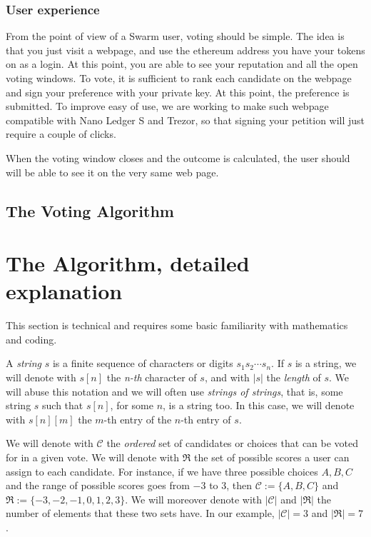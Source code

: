 \documentclass[submission, copyright,creativecommons,sharealike,noncommercial]{eptcs}
\newcommand{\candidates}{\ensuremath{\mathcal{C}} \xspace}
\newcommand{\range}{\ensuremath{\mathfrak{R}}\xspace}
\begin{document}
\subsubsection{User experience}
	From the point of view of a Swarm user, voting should be simple. The idea is that you just visit a webpage, and use the ethereum address you have your tokens on as a login. At this point, you are able to see your reputation and all the open voting windows. To vote, it is sufficient to rank each candidate on the webpage and sign your preference with your private key. At this point, the preference is submitted. To improve easy of use, we are working to make such webpage compatible with Nano Ledger S and Trezor, so that signing your petition will just require a couple of clicks.
	
	When the voting window closes and the outcome is calculated, the user should will be able to see it on the very same web page.
	
\subsection{The Voting Algorithm}	










\section{The Algorithm, detailed explanation}
	This section is technical and requires some basic familiarity with mathematics and coding. 

	\begin{definition}
		A \emph{string} $s$ is a finite sequence of characters or digits $s_1 s_2 \cdots s_n$. If $s$ is a string, we will denote with $s[n]$ the \emph{n-th} character of $s$, and with $|s|$ the \emph{length} of $s$. We will abuse this notation and we will often use \emph{strings of strings}, that is, some string $s$ such that $s[n]$, for some $n$, is a string too. In this case, we will denote with $s[n][m]$ the $m$-th entry of the $n$-th entry of $s$.
	\end{definition}	
	
	\begin{definition}
		We will denote with \candidates the \emph{ordered} set of candidates or choices that can be voted for in a given vote. We will denote with \range the set of possible scores a user can assign to each candidate. For instance, if we have three possible choices $A,B,C$ and the range of possible scores goes from $-3$ to $3$, then $\candidates := \{A, B, C\}$ and $\range := \{-3,-2,-1,0,1,2,3\}$. We will moreover denote with $| \candidates|$ and $|\range|$ the number of elements that these two sets have. In our example, $|\candidates | = 3$ and $|\range|=7$.
	\end{definition}
	
\end{document}
